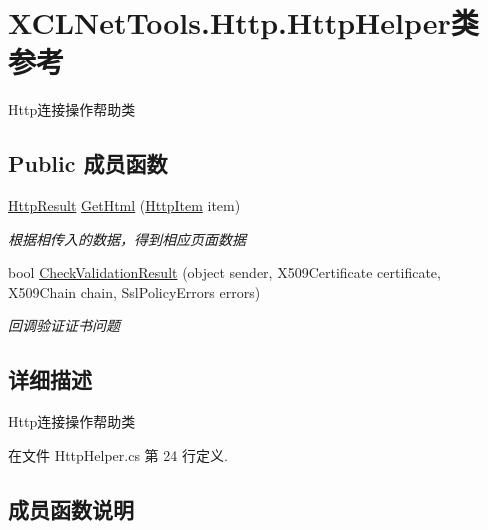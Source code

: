\hypertarget{class_x_c_l_net_tools_1_1_http_1_1_http_helper}{}\section{X\+C\+L\+Net\+Tools.\+Http.\+Http\+Helper类 参考}
\label{class_x_c_l_net_tools_1_1_http_1_1_http_helper}


Http连接操作帮助类  


\subsection*{Public 成员函数}
\begin{DoxyCompactItemize}
\item 
\hyperlink{class_x_c_l_net_tools_1_1_entity_1_1_http_1_1_http_result}{Http\+Result} \hyperlink{class_x_c_l_net_tools_1_1_http_1_1_http_helper_a1115d0f405e29654961ad3bcd5272bdf}{Get\+Html} (\hyperlink{class_x_c_l_net_tools_1_1_entity_1_1_http_1_1_http_item}{Http\+Item} item)
\begin{DoxyCompactList}\small\item\em 根据相传入的数据，得到相应页面数据 \end{DoxyCompactList}\item 
bool \hyperlink{class_x_c_l_net_tools_1_1_http_1_1_http_helper_aed104c08e4f4e44e2f3b7529e85c2848}{Check\+Validation\+Result} (object sender, X509\+Certificate certificate, X509\+Chain chain, Ssl\+Policy\+Errors errors)
\begin{DoxyCompactList}\small\item\em 回调验证证书问题 \end{DoxyCompactList}\end{DoxyCompactItemize}


\subsection{详细描述}
Http连接操作帮助类 



在文件 Http\+Helper.\+cs 第 24 行定义.



\subsection{成员函数说明}
